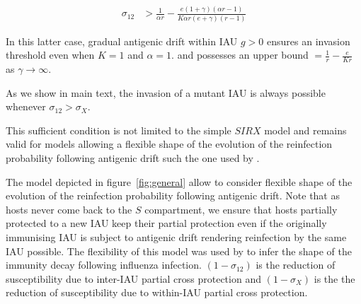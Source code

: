 \begin{align}
  \label{eq:appendix3:threshold}
  \sigma_{12} &> \frac{1}{\alpha r} - \frac{e(1+\gamma)(\alpha r-1)}{K
    \alpha r (e+\gamma)(r-1)}
\end{align}

In this latter case, gradual antigenic drift within IAU $g>0$ ensures
an invasion threshold even when $K=1$ and $\alpha=1$.  and possesses
an upper bound $=\frac{1}{r} - \frac{e}{K r}$ as $\gamma \to \infty$.

As we show in main text, the invasion of a mutant IAU is always
possible whenever $\sigma_{12} > \sigma_X$.

This sufficient condition is not limited to the simple $SIRX$ model
and remains valid for models allowing a flexible shape of the
evolution of the reinfection probability following antigenic drift
such the one used by \citet{Xia2005}.


The model depicted in figure~\ref{fig:general} allow to consider
flexible shape of the evolution of the reinfection probability
following antigenic drift.  Note that as hosts never come back to the
$S$ compartment, we ensure that hosts partially protected to a new IAU
keep their partial protection even if the originally immunising IAU is
subject to antigenic drift rendering reinfection by the same IAU
possible.  The flexibility of this model was used by \cite{Xia2005} to
infer the shape of the immunity decay following influenza infection.
$(1-\sigma_{12})$ is the reduction of susceptibility due to inter-IAU
partial cross protection and $(1-\sigma_X)$ is the the reduction of
susceptibility due to within-IAU partial cross protection.

